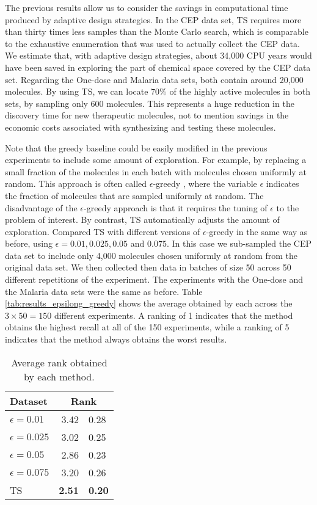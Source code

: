 The previous results allow us to consider the savings in computational time produced by adaptive design strategies. In the CEP data set, TS requires more than thirty times less samples than the Monte Carlo search, which is comparable to the exhaustive enumeration that was used to actually collect the CEP data. We estimate that, with adaptive design strategies, about 34,000 CPU years would have been saved in exploring the part of chemical space covered by the CEP data set. Regarding the One-dose and Malaria data sets, both contain around 20,000 molecules. By using TS, we can locate 70\% of the highly active molecules in both sets, by sampling only 600 molecules. This represents a huge reduction in the discovery time for new therapeutic molecules, not to mention savings in the economic costs associated with synthesizing and testing these molecules.

Note that the greedy baseline could be easily modified in the previous experiments to include some amount of exploration. For example, by replacing a small fraction of the molecules in each batch with molecules chosen uniformly at random. This approach is often called $\epsilon$-greedy \cite{watkins1989learning}, where the variable $\epsilon$ indicates the fraction of molecules that are sampled uniformly at random. The disadvantage of the $\epsilon$-greedy approach is that it requires the tuning of $\epsilon$ to the problem of interest. By contrast, TS automatically adjusts the amount of exploration. Compared TS with different versions of $\epsilon$-greedy in the same way as before, using $\epsilon = 0.01, 0.025, 0.05$ and $0.075$. In this case we sub-sampled the CEP data set to include only 4,000 molecules chosen uniformly at random from the original data set. We then collected then data in batches of size 50 across 50 different repetitions of the experiment. The experiments with the One-dose and the Malaria data sets were the same as before. Table \ref{tab:results_epsilong_greedy} shows the average obtained by each across the $3\times 50 = 150$ different experiments. A ranking of 1 indicates that the method obtains the highest recall at all of the 150 experiments, while a ranking of 5 indicates that the method always obtains the worst results.

\begin{table}
\centering
\caption{Average rank obtained by each method.}\label{tab:results_epsilon_greedy}
\begin{tabular}{lr@{$\pm$}l}
\hline
\bf{Dataset}& \multicolumn{2}{c}{\bf{Rank}}\\
\hline
$\epsilon = 0.01$ & 3.42 & 0.28 \\
$\epsilon = 0.025$ & 3.02 & 0.25 \\
$\epsilon = 0.05$ & 2.86 & 0.23 \\
$\epsilon = 0.075$ & 3.20 & 0.26 \\
TS & \bf{ 2.51 }&\bf{ 0.20 } \\
\hline
\end{tabular}
\end{table}
